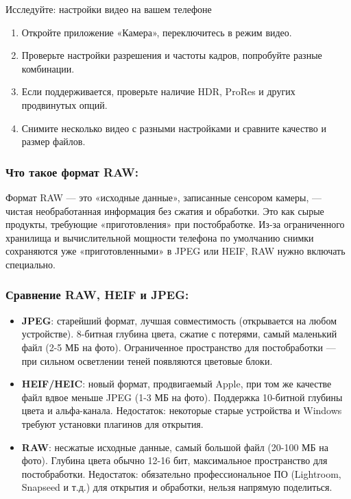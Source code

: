 \begin{tcbpractice}{Исследуйте: настройки видео на вашем телефоне}
\begin{enumerate}
  \item Откройте приложение «Камера», переключитесь в режим видео.
  \item Проверьте настройки разрешения и частоты кадров, попробуйте разные комбинации.
  \item Если поддерживается, проверьте наличие HDR, ProRes и других продвинутых опций.
  \item Снимите несколько видео с разными настройками и сравните качество и размер файлов.
\end{enumerate}

\end{tcbpractice}


\subsubsection*{Что такое формат RAW:}

Формат RAW — это «исходные данные», записанные сенсором камеры, — чистая необработанная информация без сжатия и обработки. Это как сырые продукты, требующие «приготовления» при постобработке. Из-за ограниченного хранилища и вычислительной мощности телефона по умолчанию снимки сохраняются уже «приготовленными» в JPEG или HEIF, RAW нужно включать специально.

\subsubsection*{Сравнение RAW, HEIF и JPEG:}

\begin{itemize}
  \item \textbf{JPEG}: старейший формат, лучшая совместимость (открывается на любом устройстве). 8-битная глубина цвета, сжатие с потерями, самый маленький файл (2-5 МБ на фото). Ограниченное пространство для постобработки — при сильном осветлении теней появляются цветовые блоки.
  \item \textbf{HEIF/HEIC}: новый формат, продвигаемый Apple, при том же качестве файл вдвое меньше JPEG (1-3 МБ на фото). Поддержка 10-битной глубины цвета и альфа-канала. Недостаток: некоторые старые устройства и Windows требуют установки плагинов для открытия.
  \item \textbf{RAW}: несжатые исходные данные, самый большой файл (20-100 МБ на фото). Глубина цвета обычно 12-16 бит, максимальное пространство для постобработки. Недостаток: обязательно профессиональное ПО (Lightroom, Snapseed и т.д.) для открытия и обработки, нельзя напрямую поделиться.
\end{itemize}

